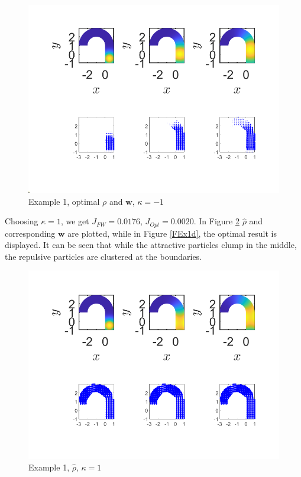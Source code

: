 \documentclass[11pt, a4paper]{article}
\theoremstyle{definition}
\newcommand{\w}{\mathbf{w}}
\begin{document}
\begin{figure}[h]
	\centering
	\includegraphics[scale=0.6]{Opt1n1.png}
	\caption{Example 1, optimal $\rho$ and $\w$, $\kappa = -1$} 
	\label{FEx1b}
\end{figure}
Choosing $\kappa = 1$, we get $J_{FW} = 0.0176$, $J_{Opt} = 0.0020$. In Figure \ref{FEx1c} $\widehat \rho$ and corresponding $\w$ are plotted, while in Figure \ref{FEx1d}, the optimal result is displayed. It can be seen that while the attractive particles clump in the middle, the repulsive particles are clustered at the boundaries.
\begin{figure}[h]
	\centering
	\includegraphics[scale=0.6]{FW11.png}
	\caption{Example 1, $\widehat \rho$, $\kappa = 1$} 
	\label{FEx1c}
\end{figure}
\end{document}
